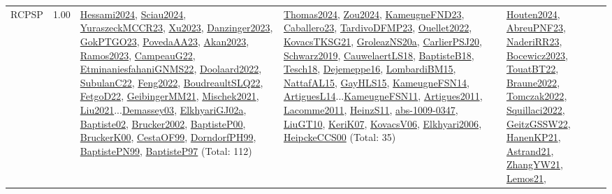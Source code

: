 {\begin{longtable}{p{3cm}r>{\raggedright\arraybackslash}p{6cm}>{\raggedright\arraybackslash}p{6cm}>{\raggedright\arraybackslash}p{8cm}}
\index{RCPSP}\index{Classification!RCPSP}RCPSP &  1.00 & \hyperref[detail:Hessami2024]{Hessami2024}, \hyperref[detail:Sciau2024]{Sciau2024}, \hyperref[detail:YuraszeckMCCR23]{YuraszeckMCCR23}, \hyperref[detail:Xu2023]{Xu2023}, \hyperref[detail:Danzinger2023]{Danzinger2023}, \hyperref[detail:GokPTGO23]{GokPTGO23}, \hyperref[detail:PovedaAA23]{PovedaAA23}, \hyperref[detail:Akan2023]{Akan2023}, \hyperref[detail:Ramos2023]{Ramos2023}, \hyperref[detail:CampeauG22]{CampeauG22}, \hyperref[detail:EtminaniesfahaniGNMS22]{EtminaniesfahaniGNMS22}, \hyperref[detail:Doolaard2022]{Doolaard2022}, \hyperref[detail:SubulanC22]{SubulanC22}, \hyperref[detail:Feng2022]{Feng2022}, \hyperref[detail:BoudreaultSLQ22]{BoudreaultSLQ22}, \hyperref[detail:FetgoD22]{FetgoD22}, \hyperref[detail:GeibingerMM21]{GeibingerMM21}, \hyperref[detail:Mischek2021]{Mischek2021}, \hyperref[detail:Liu2021]{Liu2021}...\hyperref[detail:Demassey03]{Demassey03}, \hyperref[detail:ElkhyariGJ02a]{ElkhyariGJ02a}, \hyperref[detail:Baptiste02]{Baptiste02}, \hyperref[detail:Brucker2002]{Brucker2002}, \hyperref[detail:BaptisteP00]{BaptisteP00}, \hyperref[detail:BruckerK00]{BruckerK00}, \hyperref[detail:CestaOF99]{CestaOF99}, \hyperref[detail:DorndorfPH99]{DorndorfPH99}, \hyperref[detail:BaptistePN99]{BaptistePN99}, \hyperref[detail:BaptisteP97]{BaptisteP97} (Total: 112) & \hyperref[detail:Thomas2024]{Thomas2024}, \hyperref[detail:Zou2024]{Zou2024}, \hyperref[detail:KameugneFND23]{KameugneFND23}, \hyperref[detail:Caballero23]{Caballero23}, \hyperref[detail:TardivoDFMP23]{TardivoDFMP23}, \hyperref[detail:Ouellet2022]{Ouellet2022}, \hyperref[detail:KovacsTKSG21]{KovacsTKSG21}, \hyperref[detail:GroleazNS20a]{GroleazNS20a}, \hyperref[detail:CarlierPSJ20]{CarlierPSJ20}, \hyperref[detail:Schwarz2019]{Schwarz2019}, \hyperref[detail:CauwelaertLS18]{CauwelaertLS18}, \hyperref[detail:BaptisteB18]{BaptisteB18}, \hyperref[detail:Tesch18]{Tesch18}, \hyperref[detail:Dejemeppe16]{Dejemeppe16}, \hyperref[detail:LombardiBM15]{LombardiBM15}, \hyperref[detail:NattafAL15]{NattafAL15}, \hyperref[detail:GayHLS15]{GayHLS15}, \hyperref[detail:KameugneFSN14]{KameugneFSN14}, \hyperref[detail:ArtiguesL14]{ArtiguesL14}...\hyperref[detail:KameugneFSN11]{KameugneFSN11}, \hyperref[detail:Artigues2011]{Artigues2011}, \hyperref[detail:Lacomme2011]{Lacomme2011}, \hyperref[detail:HeinzS11]{HeinzS11}, \hyperref[detail:abs-1009-0347]{abs-1009-0347}, \hyperref[detail:LiuGT10]{LiuGT10}, \hyperref[detail:KeriK07]{KeriK07}, \hyperref[detail:KovacsV06]{KovacsV06}, \hyperref[detail:Elkhyari2006]{Elkhyari2006}, \hyperref[detail:HeipckeCCS00]{HeipckeCCS00} (Total: 35) & \hyperref[detail:Houten2024]{Houten2024}, \hyperref[detail:AbreuPNF23]{AbreuPNF23}, \hyperref[detail:NaderiRR23]{NaderiRR23}, \hyperref[detail:Bocewicz2023]{Bocewicz2023}, \hyperref[detail:TouatBT22]{TouatBT22}, \hyperref[detail:Braune2022]{Braune2022}, \hyperref[detail:Tomczak2022]{Tomczak2022}, \hyperref[detail:Squillaci2022]{Squillaci2022}, \hyperref[detail:GeitzGSSW22]{GeitzGSSW22}, \hyperref[detail:HanenKP21]{HanenKP21}, \hyperref[detail:Astrand21]{Astrand21}, \hyperref[detail:ZhangYW21]{ZhangYW21}, \hyperref[detail:Lemos21]{Lemos21}, 
\end{longtable}}
